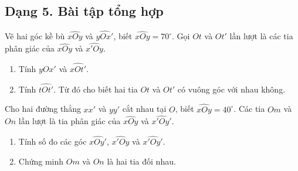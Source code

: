 \subsection{Dạng 5. Bài tập tổng hợp}

\begin{bt}
	Vẽ hai góc kề bù $\widehat{xOy}$ và $\widehat{yOx'}$, biết
	$\widehat{xOy}=70^\circ$. Gọi $Ot$ và $Ot'$ lần lượt là các tia phân giác
	của $\widehat{xOy}$ và $\widehat{x'Oy}$.
	
	\begin{enumerate}[label=\alph*)]
		\item Tính $\widehat{yOx'}$ và $\widehat{xOt'}$.
		
		\item Tính $\widehat{tOt'}$. Từ đó cho biết hai tia $Ot$ và $Ot'$ có
		vuông góc với nhau không.
	\end{enumerate}
\end{bt}

\begin{bt}
	Cho hai đường thẳng $xx'$ và $yy'$ cắt nhau tại $O$, biết
	$\widehat{xOy}=40^\circ$. Các tia $Om$ và $On$ lần lượt là tia phân giác
	của $\widehat{xOy}$ và $\widehat{x'Oy'}$.
	
	\begin{enumerate}[label=\alph*)]
		\item Tính số đo các góc $\widehat{xOy'}$, $\widehat{x'Oy}$ và
		$\widehat{x'Oy'}$.
		
		\item Chứng minh $Om$ và $On$ là hai tia đối nhau.
	\end{enumerate}
\end{bt}


